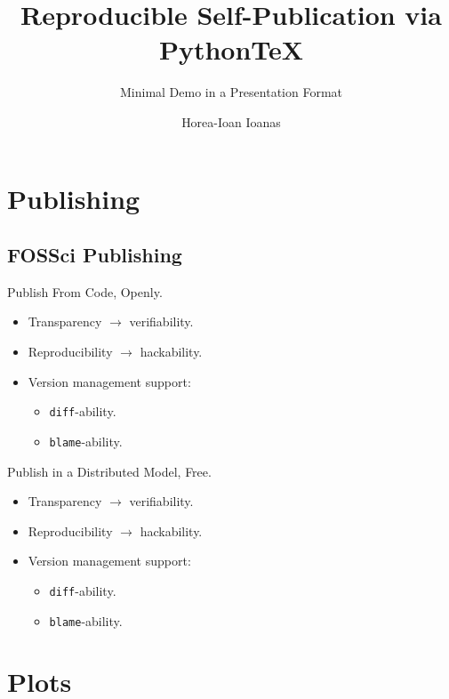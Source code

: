 
\title[Reproducible Self-Publication via Python\TeX\ --- Minimal Demo in a Presentation Format]{Reproducible Self-Publication via Python\TeX}
\subtitle{Minimal Demo in a Presentation Format}
\author{Horea-Ioan Ioanas}

	\begin{frame}
		\titlepage
	\end{frame}
	\section{Publishing}
		\subsection{FOSSci Publishing}
			\begin{frame}{Publish From Code, Openly.}
				\begin{itemize}
					\item Transparency $\longrightarrow$ verifiability.
					\item Reproducibility $\longrightarrow$ hackability.
					\item Version management support:
					\begin{itemize}
						\item \colorbox{tlg}{\texttt{diff}}-ability.
						\item \colorbox{tlg}{\texttt{blame}}-ability.
					\end{itemize}
				\end{itemize}
			\end{frame}
			\begin{frame}{Publish in a Distributed Model, Free.}
				\begin{itemize}
					\item Transparency $\longrightarrow$ verifiability.
					\item Reproducibility $\longrightarrow$ hackability.
					\item Version management support:
					\begin{itemize}
						\item \colorbox{tlg}{\texttt{diff}}-ability.
						\item \colorbox{tlg}{\texttt{blame}}-ability.
					\end{itemize}
				\end{itemize}
			\end{frame}
	\section{Plots}
